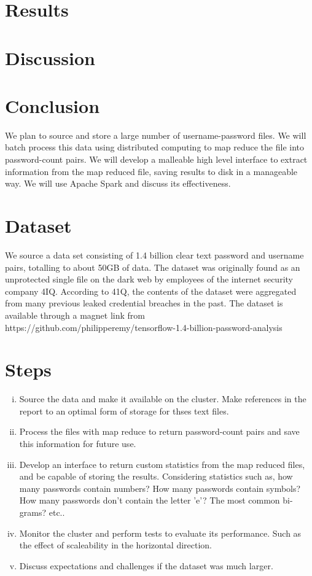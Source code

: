 \documentclass{article}
\begin{document}
\begin{multicols}{2}
\section*{ Results}

\section*{ Discussion}
\cite{kelley2012guess} \cite{weir2009password}

\section*{ Conclusion}

{\color{red}

We plan to source and store a large number of username-password files. We will batch process this data using distributed computing to map reduce the file into password-count pairs. We will develop a malleable high level interface to extract information from the map reduced file, saving results to disk in a manageable way.  We will use Apache Spark and discuss its effectiveness.

\section*{Dataset}
We source a data set consisting of 1.4 billion clear text password and username pairs, totalling to about 50GB of data. The dataset was originally found as an unprotected single file on the dark web by employees of the internet security company 4IQ. According to 41Q, the contents of the dataset were aggregated from many previous leaked credential breaches in the past. The dataset is available through a magnet link from https://github.com/philipperemy/tensorflow-1.4-billion-password-analysis

\section*{Steps}

\begin{enumerate}[(i)]

\item Source the data and make it available on the cluster. Make references in the report to an optimal form of storage for thses text files.
\item Process the files with map reduce to return password-count pairs and save this information for future use.
\item Develop an interface to return custom statistics from the map reduced files, and be capable of storing the results. Considering statistics such as, how many passwords contain numbers? How many passwords contain symbols? How many passwords don't contain the letter 'e'? The most common bi-grams? etc..
\item Monitor the cluster and perform tests to evaluate its performance. Such as the effect of scaleability in the horizontal direction.
\item Discuss expectations and challenges if the dataset was much larger.


\end{enumerate}}
\end{multicols}
\end{document}
